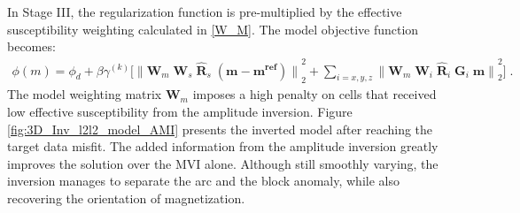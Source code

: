 In Stage III, the regularization function is pre-multiplied by the effective susceptibility weighting calculated in \ref{W_M}.
The model objective function becomes:
\begin{equation} \label{eq:S-IRLS_CMI}
\begin{aligned}
\phi(m) =  \phi_d + \beta \gamma^{(k)} \Big [ {\|\mathbf{W}_m\; \mathbf{W}_s\;  \mathbf{\hat R}_s \;( \mathbf{m - m^{ref}})\|}^2_2  + \sum_{i = x,y,z}  {\| \mathbf{W}_m\;  \mathbf{W}_i \;  \mathbf{\hat R}_i  \; \mathbf{G}_i \; \mathbf{m}\|}^2_2  \Big ]\;.
\end{aligned}
  \end{equation}
 The model weighting matrix $\mathbf{W}_m$ imposes a high penalty on cells that received low effective susceptibility from the amplitude inversion. 
 Figure \ref{fig:3D_Inv_l2l2_model_AMI} presents the inverted model after reaching the target data misfit. The added information from the amplitude inversion greatly improves the solution over the MVI alone. Although still smoothly varying, the inversion manages to separate the arc and the block anomaly, while also recovering the orientation of magnetization.

